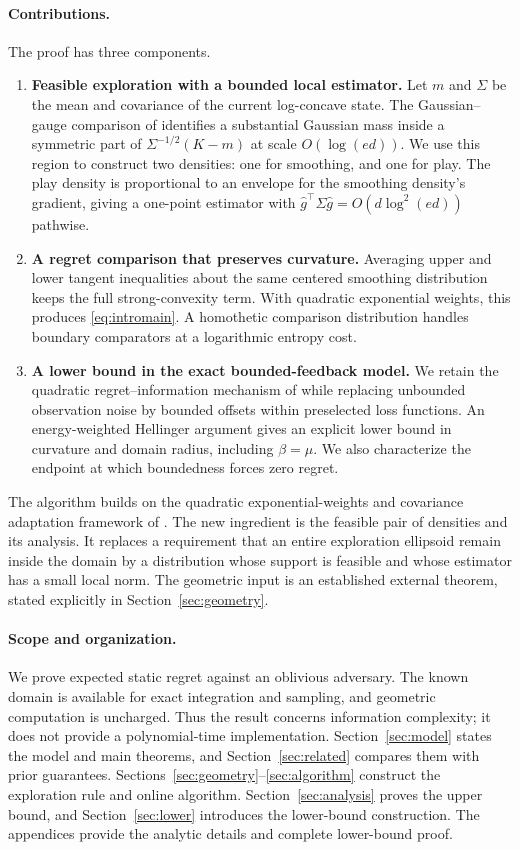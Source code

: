 \documentclass[11pt]{article}
\numberwithin{equation}{section}
\newcounter{algorithm}
\theoremstyle{definition}
\theoremstyle{remark}
\begin{document}
\paragraph{Contributions.}
The proof has three components.
\begin{enumerate}
 \item \textbf{Feasible exploration with a bounded local estimator.}
 Let $m$ and $\Sigma$ be the mean and covariance of the current log-concave
 state. The Gaussian--gauge comparison of \citet{BK26} identifies a substantial
 Gaussian mass inside a symmetric part of $\Sigma^{-1/2}(K-m)$ at scale
 $O(\log(ed))$. We use this region to construct two densities: one for smoothing,
 and one for play. The play density is proportional to an envelope for the
 smoothing density's gradient, giving a one-point estimator with
 $\widehat g^{\top}\Sigma\widehat g=O(d\log^2(ed))$ pathwise.
 \item \textbf{A regret comparison that preserves curvature.}
 Averaging upper and lower tangent inequalities about the same centered
 smoothing distribution keeps the full strong-convexity term. With quadratic
 exponential weights, this produces \eqref{eq:intromain}. A homothetic
 comparison distribution handles boundary comparators at a logarithmic
 entropy cost.
 \item \textbf{A lower bound in the exact bounded-feedback model.}
 We retain the quadratic regret--information mechanism of \citet{Shamir13}
 while replacing unbounded observation noise by bounded offsets within
 preselected loss functions. An energy-weighted Hellinger argument gives an
 explicit lower bound in curvature and domain radius, including $\beta=\mu$.
 We also characterize the endpoint at which boundedness forces zero regret.
\end{enumerate}

The algorithm builds on the quadratic exponential-weights and covariance
adaptation framework of \citet{Ito20}. The new ingredient is the feasible
pair of densities and its analysis. It replaces a requirement that an entire
exploration ellipsoid remain inside the domain by a distribution whose support
is feasible and whose estimator has a small local norm. The geometric input is
an established external theorem, stated explicitly in
Section~\ref{sec:geometry}.

\paragraph{Scope and organization.}
We prove expected static regret against an oblivious adversary. The known
domain is available for exact integration and sampling, and geometric
computation is uncharged. Thus the result concerns information complexity;
it does not provide a polynomial-time implementation. Section~\ref{sec:model}
states the model and main theorems, and Section~\ref{sec:related} compares them
with prior guarantees. Sections~\ref{sec:geometry}--\ref{sec:algorithm}
construct the exploration rule and online algorithm.
Section~\ref{sec:analysis} proves the upper bound, and
Section~\ref{sec:lower} introduces the lower-bound construction. The appendices
provide the analytic details and complete lower-bound proof.
\end{document}
